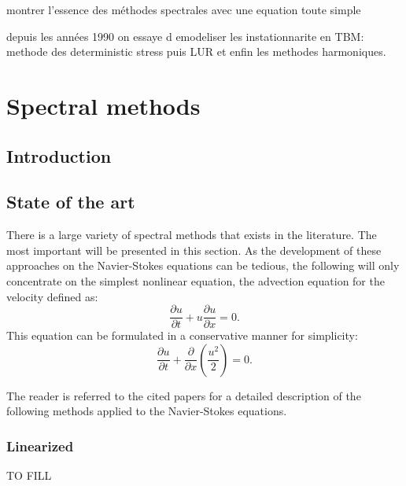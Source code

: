 
montrer l'essence des méthodes spectrales avec une equation toute simple

depuis les années 1990 on essaye d emodeliser les instationnarite en TBM:
methode des deterministic stress puis LUR et enfin les methodes harmoniques.

\chapter{Spectral methods} %
\label{cha:spectral_methods}

\section{Introduction} %
\label{sec:sm_introduction}

\section{State of the art} %
\label{sec:sm_state_of_the_art}

There is a large variety of spectral methods that exists in the
literature. The most important will be presented in this section.
As the development of these approaches on the Navier-Stokes equations
can be tedious, the following will only concentrate on the simplest
nonlinear equation, the advection equation for the velocity
defined as:
\begin{equation}
	\frac{\partial u}{\partial t} + 
	u \frac{\partial u}{\partial x} = 
	0.
	\label{eq:sm_nonlinear_convection}
\end{equation}
This equation can be formulated in a conservative manner for simplicity:
\begin{equation}
	\frac{\partial u}{\partial t} + 
	\frac{\partial}{\partial x} \left( \frac{u^2}{2} \right) = 
	0.
	\label{eq:sm_nonlinear_convection_conservative}
\end{equation}

The reader is referred to the cited papers for a detailed description
of the following methods applied to the Navier-Stokes equations.

\subsection{Linearized} %
\label{sub:sm_linearized_method}

TO FILL

